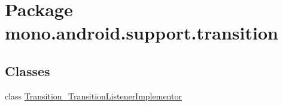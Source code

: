 \hypertarget{namespacemono_1_1android_1_1support_1_1transition}{
\section{Package mono.android.support.transition}
\label{namespacemono_1_1android_1_1support_1_1transition}
}
\subsection*{Classes}
\begin{CompactItemize}
\item 
class \hyperlink{classmono_1_1android_1_1support_1_1transition_1_1_transition___transition_listener_implementor}{Transition\_\-TransitionListenerImplementor}
\end{CompactItemize}

